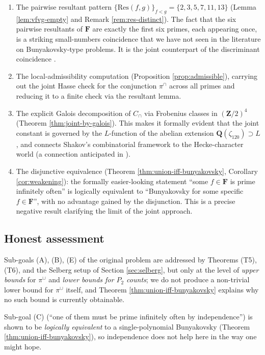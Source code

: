 \documentclass[11pt]{article}
\theoremstyle{definition}
\newcommand{\Z}{\mathbf{Z}}
\newcommand{\Q}{\mathbf{Q}}
\newcommand{\F}{\mathbf{F}}
\newcommand{\F}{\mathcal{F}}
\begin{document}
\begin{enumerate}
\item[(N1)] The pairwise resultant pattern $\{\mathrm{Res}(f,g)\}_{f<g}=\{2,3,5,7,11,13\}$ (Lemma \ref{lem:vfvg-empty} and Remark \ref{rem:res-distinct}). The fact that the six pairwise resultants of $\F$ are exactly the first six primes, each appearing once, is a striking small-numbers coincidence that we have not seen in the literature on Bunyakovsky-type problems. It is the joint counterpart of the discriminant coincidence \cite{B2}.

\item[(N2)] The local-admissibility computation (Proposition \ref{prop:admissible}), carrying out the joint Hasse check for the conjunction $\pi^\cap$ across all primes and reducing it to a finite check via the resultant lemma.

\item[(N3)] The explicit Galois decomposition of $C_\cap$ via Frobenius classes in $(\Z/2)^4$ (Theorem \ref{thm:joint-by-galois}). This makes it formally evident that the joint constant is governed by the $L$-function of the abelian extension $\Q(\zeta_{120})\supset L$, and connects Shakov's combinatorial framework to the Hecke-character world (a connection anticipated in \cite[B2]{B2}).

\item[(N4)] The disjunctive equivalence (Theorem \ref{thm:union-iff-bunyakovsky}, Corollary \ref{cor:weakening}): the formally easier-looking statement ``some $f\in\F$ is prime infinitely often'' is logically equivalent to ``Bunyakovsky for some specific $f\in\F$'', with no advantage gained by the disjunction. This is a precise negative result clarifying the limit of the joint approach.
\end{enumerate}

\subsection{Honest assessment}

Sub-goals (A), (B), (E) of the original problem are addressed by Theorems (T5), (T6), and the Selberg setup of Section \ref{sec:selberg}, but only at the level of \emph{upper bounds} for $\pi^\cup$ and \emph{lower bounds for $P_2$ counts}; we do not produce a non-trivial lower bound for $\pi^\cup$ itself, and Theorem \ref{thm:union-iff-bunyakovsky} explains why no such bound is currently obtainable.

Sub-goal (C) (``one of them must be prime infinitely often by independence'') is shown to be \emph{logically equivalent} to a single-polynomial Bunyakovsky (Theorem \ref{thm:union-iff-bunyakovsky}), so independence does not help here in the way one might hope.
\end{document}
